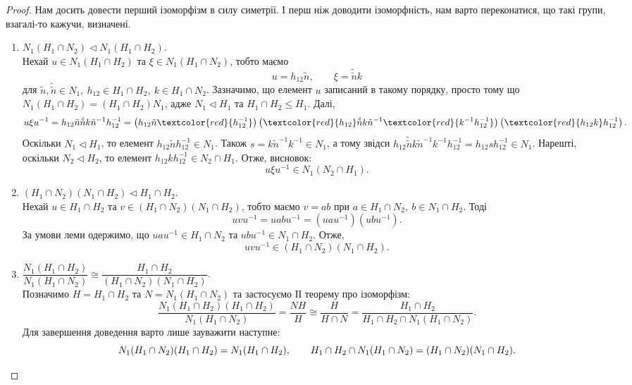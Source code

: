 \documentclass{math_library}
\begin{document}
\begin{proof}
Нам досить довести перший ізоморфізм в силу симетрії. І перш ніж доводити ізоморфність, нам варто переконатися, що такі групи, взагалі-то кажучи, визначені.

\begin{enumerate}[wide=0pt,label={\Roman*.}]
\item $N_1 (H_1 \cap N_2) \triangleleft N_1(H_1 \cap H_2)$.\\
Нехай $u \in N_1(H_1 \cap H_2)$ та $\xi \in N_1(H_1 \cap N_2)$, тобто маємо
\[
u = h_{12} \tilde{n}, \qquad \xi = \tilde{\tilde{n}} k
\]
для $\tilde{n}, \tilde{\tilde{n}} \in N_1,\ h_{12} \in H_1 \cap H_2,\ k \in H_1 \cap N_2$. Зазначимо, що елемент $u$ записаний в такому порядку, просто тому що $N_1(H_1 \cap H_2) = (H_1 \cap H_2) N_1$, адже $N_1 \triangleleft H_1$ та $H_1 \cap H_2 \leq H_1$. Далі,
\[
u \xi u^{-1} = h_{12} \tilde{n} \tilde{\tilde{n}} k \tilde{n}^{-1} h_{12}^{-1} = \left( h_{12} \tilde{n} \textcolor{red}{h_{12}^{-1}} \right) \left( \textcolor{red}{h_{12}} \tilde{\tilde{n}} k \tilde{n}^{-1} \textcolor{red}{k^{-1} h_{12}^{-1}} \right) \left( \textcolor{red}{h_{12} k} h_{12}^{-1} \right).
\]
Оскільки $N_1 \triangleleft H_1$, то елемент $h_{12} \tilde{n} h_{12}^{-1} \in N_1$. Також $s = k \tilde{n}^{-1} k^{-1} \in N_1$, а тому звідси $h_{12} \tilde{\tilde{n}} k \tilde{n}^{-1} k^{-1} h_{12}^{-1} = h_{12} s h_{12}^{-1} \in N_1$. Нарешті, оскільки $N_2 \triangleleft H_2$, то елемент $h_{12} k h_{12}^{-1} \in N_2 \cap H_1$. Отже, висновок:
\[
u \xi u^{-1} \in N_1 (N_2 \cap H_1).
\]

\item $(H_1 \cap N_2) (N_1 \cap H_2) \triangleleft H_1 \cap H_2$.\\
Нехай $u \in H_1 \cap H_2$ та $v \in (H_1 \cap N_2)(N_1 \cap H_2)$, тобто маємо $v = ab$ при $a \in H_1 \cap N_2,\ b \in N_1 \cap H_2$. Тоді
\[
uvu^{-1} = uabu^{-1} = (uau^{-1})(ubu^{-1}).
\]
За умови леми одержимо, що $uau^{-1} \in H_1 \cap N_2$ та $ubu^{-1} \in N_1 \cap H_2$. Отже,
\[
uvu^{-1} \in (H_1 \cap N_2)(N_1 \cap H_2).
\]

\item $\dfrac{N_1 (H_1 \cap H_2)}{N_1(H_1 \cap N_2)} \cong \dfrac{H_1 \cap H_2}{(H_1 \cap N_2) (N_1 \cap H_2)}$.\\
Позначимо $H = H_1 \cap H_2$ та $N = N_1(H_1 \cap N_2)$ та застосуємо ІІ теорему про ізоморфізм:
\[
\dfrac{N_1(H_1 \cap H_2)(H_1 \cap H_2)}{N_1(H_1 \cap N_2)} = \dfrac{NH}{H} \cong \dfrac{H}{H \cap N} = \dfrac{H_1 \cap H_2}{H_1 \cap H_2 \cap N_1(H_1 \cap N_2)}.
\]
Для завершення доведення варто лише зауважити наступне:
\[
N_1 (H_1 \cap N_2)(H_1 \cap H_2) = N_1(H_1 \cap H_2), \qquad H_1 \cap H_2 \cap N_1(H_1 \cap N_2) = (H_1 \cap N_2)(N_1 \cap H_2). \qedhere
\]
\end{enumerate}
\end{proof}
\end{document}
